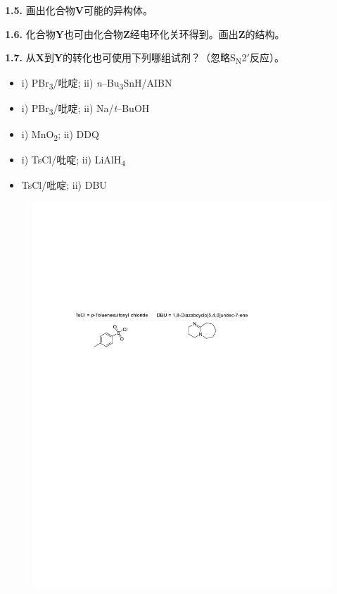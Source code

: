 \noindent\textbf{1.5.} 画出化合物\textbf{V}可能的异构体。

\noindent\textbf{1.6.} 化合物\textbf{Y}也可由化合物\textbf{Z}经电环化关环得到。画出\textbf{Z}的结构。

\noindent\textbf{1.7.} 从\textbf{X}到\textbf{Y}的转化也可使用下列哪组试剂？（忽略S\textsubscript{N}2$'$反应）。

\renewcommand{\labelitemi}{$\square$}
\begin{itemize}
	\item i) PBr\textsubscript{3}/吡啶; ii)  \textit{n}--Bu\textsubscript{3}SnH/AIBN
	\item i) PBr\textsubscript{3}/吡啶; ii) Na/\emph{t}--BuOH
	\item i) MnO\textsubscript{2}; ii) DDQ
	\item i) TsCl/吡啶; ii) LiAlH\textsubscript{4}
	\item TsCl/吡啶; ii) DBU
\end{itemize}
\renewcommand{\labelitemi}{$\bullet$}

\begin{figure}[h]
	\centering
	\includegraphics[width=12cm]{./pic/t1-5.pdf}
\end{figure}

